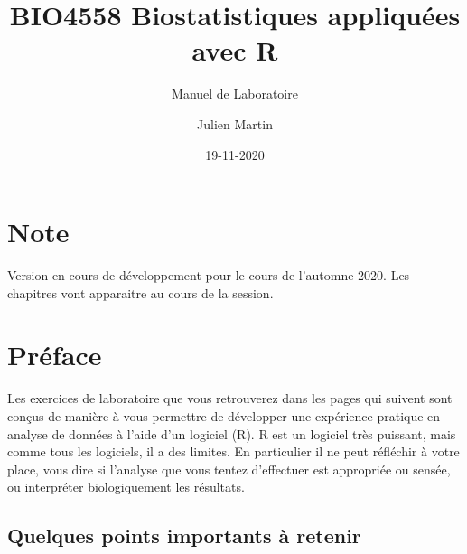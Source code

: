 \documentclass[12pt,]{book}
\title{BIO4558 Biostatistiques appliquées avec R}
\subtitle{Manuel de Laboratoire}
\author{Julien Martin}
\date{19-11-2020}
\begin{document}
\maketitle



{
\setcounter{tocdepth}{1}
\tableofcontents
}
\hypertarget{note}{%
\chapter*{Note}\label{note}}

Version en cours de développement pour le cours de l'automne 2020. Les chapitres vont apparaitre au cours de la session.

\hypertarget{pruxe9face}{%
\chapter*{Préface}\label{pruxe9face}}

Les exercices de laboratoire que vous retrouverez dans les pages qui suivent sont conçus de manière à vous permettre de développer une expérience pratique en analyse de données à l'aide d'un logiciel (R).
R est un logiciel très puissant, mais comme tous les logiciels, il a des limites.
En particulier il ne peut réfléchir à votre place, vous dire si l'analyse que vous tentez d'effectuer est appropriée ou sensée, ou interpréter biologiquement les résultats.

\hypertarget{quelques-points-importants-uxe0-retenir}{%
\section*{Quelques points importants à retenir}\label{quelques-points-importants-uxe0-retenir}}
\end{document}

